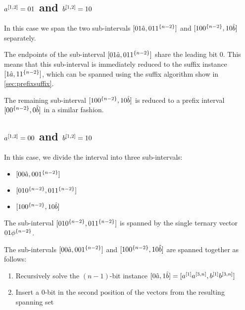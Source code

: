 \subsection{\texorpdfstring
{$a^{[1, 2]} = 01$ and $b^{[1, 2]} = 10$}
{ = 01 and  = 10}
}
\label{sec:1interval0110}

In this case
we span the two sub-intervals
$[01 \hat{a}, 01 1^{\{n-2\}}]$
and
$[10 0^{\{n-2\}}, 10 \hat{b}]$
separately.

The endpoints of the sub-interval
$[01 \hat{a}, 01 1^{\{n-2\}}]$
share the leading bit $0$.
This means that this sub-interval is immediately
reduced to the suffix instance
$[1 \hat{a}, 1 1^{\{n-2\}}]$,
which can be spanned using the suffix algorithm
show in \cref{sec:prefixsuffix}.

The remaining sub-interval
$[10 0^{\{n-2\}}, 10 \hat{b}]$
is reduced to a prefix interval
$[0 0^{\{n-2\}}, 0 \hat{b}]$
in a similar fashion.

\subsection{\texorpdfstring
{$a^{[1, 2]} = 00$ and $b^{[1, 2]} = 10$}
{ = 00 and  = 10}
}
\label{sec:0010}

In this case,
we divide the interval into three sub-intervals:

\begin{itemize}
\item $[00 \hat{a}, 00 1^{\{n-2\}}]$
\item $[01 0^{\{n-2\}}, 01 1^{\{n-2\}}]$
\item $[10 0^{\{n-2\}}, 10 \hat{b}]$
\end{itemize}

The sub-interval
$[01 0^{\{n-2\}}, 01 1^{\{n-2\}}]$
is spanned by the single ternary vector
$01 \phi^{\{n-2\}}$.

The sub-intervals
$[00 \hat{a}, 00 1^{\{n-2\}}]$
and
$[10 0^{\{n-2\}}, 10 \hat{b}]$
are spanned together as follows:

\begin{enumerate}
\item Recursively solve the $(n-1)$-bit instance
$[0 \hat{a}, 1 \hat{b}]
= [a^{[1]} a^{[3, n]}, b^{[1]} b^{[3, n]}]$
\item Insert a $0$-bit in the second position
of the vectors from the resulting spanning set
\end{enumerate}


